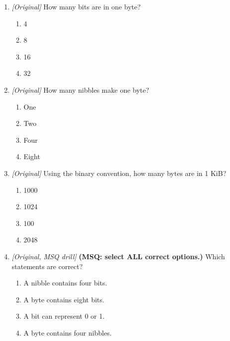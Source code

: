 \begin{enumerate}[label=\textbf{Q\arabic*.}, leftmargin=*]
\item \textit{[Original]} How many bits are in one byte?
  \begin{enumerate}[label=\Alph*.]
\item 4
   \item 8
   \item 16
   \item 32
  \end{enumerate}

\item \textit{[Original]} How many nibbles make one byte?
  \begin{enumerate}[label=\Alph*.]
\item One
   \item Two
   \item Four
   \item Eight
  \end{enumerate}

\item \textit{[Original]} Using the binary convention, how many bytes are in 1 KiB?
  \begin{enumerate}[label=\Alph*.]
\item 1000
   \item 1024
   \item 100
   \item 2048
  \end{enumerate}

\item \textit{[Original, MSQ drill]} \textbf{(MSQ: select ALL correct options.)} Which statements are correct?
  \begin{enumerate}[label=\Alph*.]
\item A nibble contains four bits.
   \item A byte contains eight bits.
   \item A bit can represent 0 or 1.
   \item A byte contains four nibbles.
  \end{enumerate}

\end{enumerate}
